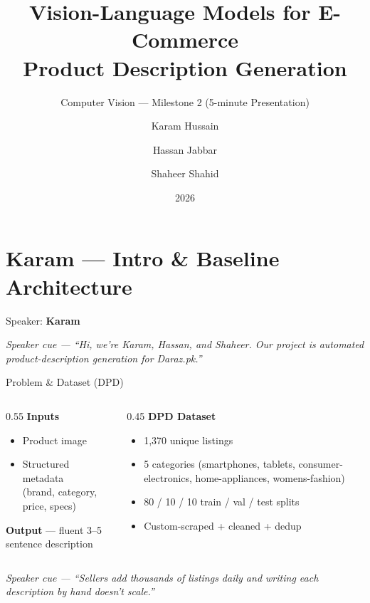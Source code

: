 \documentclass[10pt, aspectratio=169]{beamer}
\title[Daraz VLM Milestone 2]{Vision-Language Models for E-Commerce\\Product Description Generation}
\subtitle{Computer Vision --- Milestone 2 (5-minute Presentation)}
\author[K. Hussain, H. Jabbar, S. Shahid]{Karam Hussain \and Hassan Jabbar \and Shaheer Shahid}
\institute[]{}
\date{2026}
\newcommand{\speakercue}[1]{%
  \vfill
  {\footnotesize\itshape\color{gray}Speaker cue --- #1}%
}
\begin{document}
\section*{Karam --- Intro \& Baseline Architecture}

\begin{frame}
  \titlepage
  \begin{center}\small Speaker: \textbf{Karam}\end{center}
  \speakercue{``Hi, we're Karam, Hassan, and Shaheer. Our project is automated
  product-description generation for Daraz.pk.''}
\end{frame}

\begin{frame}{Problem \& Dataset (DPD)}
  \begin{columns}[T]
    \begin{column}{0.55\textwidth}
      \textbf{Inputs}
      \begin{itemize}\itemsep2pt
        \item Product image
        \item Structured metadata\\(brand, category, price, specs)
      \end{itemize}
      \medskip
      \textbf{Output} --- fluent 3--5 sentence description
    \end{column}
    \begin{column}{0.45\textwidth}
      \textbf{DPD Dataset}
      \begin{itemize}\itemsep2pt
        \item 1{,}370 unique listings
        \item 5 categories (smartphones, tablets, consumer-electronics, home-appliances, womens-fashion)
        \item 80 / 10 / 10 train / val / test splits
        \item Custom-scraped + cleaned + dedup
      \end{itemize}
    \end{column}
  \end{columns}
  \speakercue{``Sellers add thousands of listings daily and writing each description
  by hand doesn't scale.''}
\end{frame}
\end{document}
